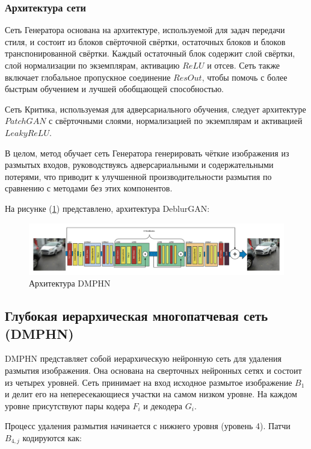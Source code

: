 \subsubsection*{Архитектура сети}

Сеть Генератора основана на архитектуре, используемой для задач передачи стиля, и состоит из блоков свёрточной свёртки, остаточных блоков и блоков транспонированной свёртки. Каждый остаточный блок содержит слой свёртки, слой нормализации по экземплярам, активацию \(ReLU\) и отсев. Сеть также включает глобальное пропускное соединение \(ResOut\), чтобы помочь с более быстрым обучением и лучшей обобщающей способностью.

Сеть Критика, используемая для адверсариального обучения, следует архитектуре \(PatchGAN\) с свёрточными слоями, нормализацией по экземплярам и активацией \(LeakyReLU\).

В целом, метод обучает сеть Генератора генерировать чёткие изображения из размытых входов, руководствуясь адверсариальными и содержательными потерями, что приводит к улучшенной производительности размытия по сравнению с методами без этих компонентов.

На рисунке (\ref{fig:deblur-gan}) представлено, архитектура DeblurGAN: 
\begin{figure}[H]
	\centering
	\includegraphics[width=1\linewidth]{assets/deblur-gan.png}
	\caption{Архитектура DMPHN}
	\label{fig:deblur-gan}
\end{figure}


\subsection{Глубокая иерархическая многопатчевая сеть (DMPHN)}

DMPHN представляет собой иерархическую нейронную сеть для удаления размытия изображения. Она основана на сверточных нейронных сетях и состоит из четырех уровней. Сеть принимает на вход исходное размытое изображение \(B_1\) и делит его на непересекающиеся участки на самом низком уровне. На каждом уровне присутствуют пары кодера \(F_i\) и декодера \(G_i\).

Процесс удаления размытия начинается с нижнего уровня (уровень 4). Патчи \(B_{4,j}\) кодируются как:


